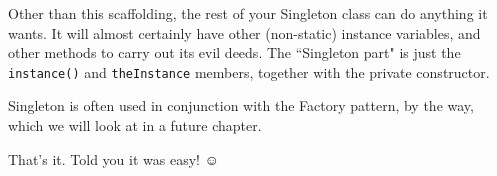 Other than this scaffolding, the rest of your Singleton class can do anything
it wants. It will almost certainly have other (non-static) instance variables,
and other methods to carry out its evil deeds. The ``Singleton part" is just
the \texttt{instance()} and \texttt{theInstance} members, together with the
private constructor.

Singleton is often used in conjunction with the Factory pattern, by the way,
which we will look at in a future chapter.

That's it. Told you it was easy! $\smiley$
